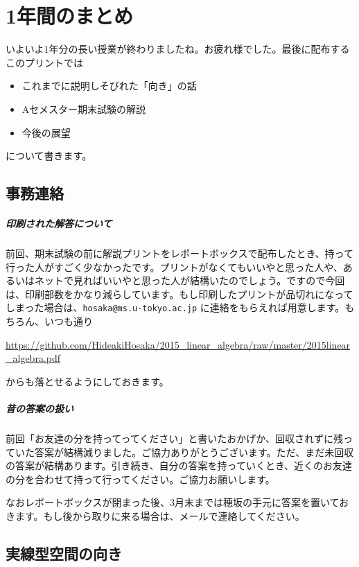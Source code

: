 \chapter{1年間のまとめ}

いよいよ$1$年分の長い授業が終わりましたね。お疲れ様でした。最後に配布するこのプリントでは
\begin{itemize}
\item これまでに説明しそびれた「向き」の話
\item Aセメスター期末試験の解説
\item 今後の展望
\end{itemize}
について書きます。

\section{事務連絡}

\paragraph{印刷された解答について}

前回、期末試験の前に解説プリントをレポートボックスで配布したとき、持って行った人がすごく少なかったです。プリントがなくてもいいやと思った人や、あるいはネットで見ればいいやと思った人が結構いたのでしょう。ですので今回は、印刷部数をかなり減らしています。もし印刷したプリントが品切れになってしまった場合は、\texttt{hosaka@ms.u-tokyo.ac.jp} に連絡をもらえれば用意します。もちろん、いつも通り
\begin{center}
\url{https://github.com/HideakiHosaka/2015_linear_algebra/raw/master/2015linear_algebra.pdf}
\end{center}
からも落とせるようにしておきます。

\paragraph{昔の答案の扱い}

前回「お友達の分を持ってってください」と書いたおかげか、回収されずに残っていた答案が結構減りました。ご協力ありがとうございます。ただ、まだ未回収の答案が結構あります。引き続き、自分の答案を持っていくとき、近くのお友達の分を合わせて持って行ってください。ご協力お願いします。

なおレポートボックスが閉まった後、3月末までは穂坂の手元に答案を置いておきます。もし後から取りに来る場合は、メールで連絡してください。

\section{実線型空間の向き}

